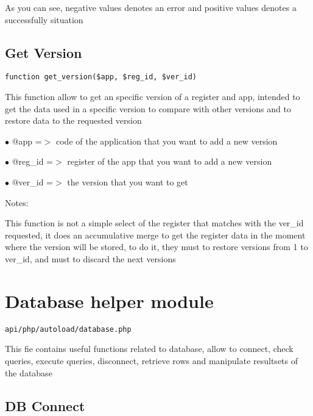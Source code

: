 \documentclass[a4paper]{book}
\begin{document}
As you can see, negative values denotes an error and positive values denotes a successfully situation

\hypertarget{toc60}{}
\subsection{Get Version}

\begin{lstlisting}
function get_version($app, $reg_id, $ver_id)
\end{lstlisting}

This function allow to get an specific version of a register and app, intended
to get the data used in a specific version to compare with other versions and
to restore data to the requested version

\begin{compactitem}
\item[\color{myblue}$\bullet$] @app    =$>$ code of the application that you want to add a new version
\item[\color{myblue}$\bullet$] @reg\_id =$>$ register of the app that you want to add a new version
\item[\color{myblue}$\bullet$] @ver\_id =$>$ the version that you want to get
\end{compactitem}

Notes:

This function is not a simple select of the register that matches with the
ver\_id requested, it does an accumulative merge to get the register data
in the moment where the version will be stored, to do it, they must to
restore versions from 1 to ver\_id, and must to discard the next versions

\hypertarget{toc61}{}
\section{Database helper module}

\begin{lstlisting}
api/php/autoload/database.php
\end{lstlisting}

This fie contains useful functions related to database, allow to connect, check queries, execute
queries, disconnect, retrieve rows and manipulate resultsets of the database

\hypertarget{toc62}{}
\subsection{DB Connect}
\end{document}
